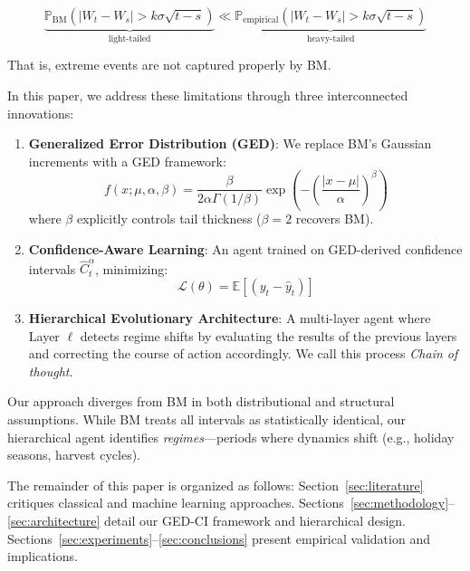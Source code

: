 \documentclass[12pt]{article}
\begin{document}
\begin{equation}
    \underbrace{\mathbb{P}_{\text{BM}}\left(|W_t - W_s| > k\sigma\sqrt{t-s}\right)}_{\text{light-tailed}} \ll \underbrace{\mathbb{P}_{\text{empirical}}(|W_t - W_s| > k\sigma\sqrt{t-s})}_{\text{heavy-tailed}}
\end{equation}

That is, extreme events are not captured properly by BM.


In this paper, we address these limitations through three interconnected innovations:
\begin{enumerate}
    \item \textbf{Generalized Error Distribution (GED)}: We replace BM's Gaussian increments with a GED framework:
    \begin{equation}
        f(x; \mu, \alpha, \beta) = \frac{\beta}{2\alpha\Gamma(1/\beta)} \exp\left(-\left(\frac{|x-\mu|}{\alpha}\right)^\beta\right)
    \end{equation}
    where $\beta$ explicitly controls tail thickness ($\beta=2$ recovers BM).
    
    \item \textbf{Confidence-Aware Learning}: An agent trained on GED-derived confidence intervals $\hat{C}_t^\alpha$, minimizing:
    \begin{equation}
        \mathscr{L}(\theta) = \mathbb{E}\left[ (y_t - \hat{y}_t) \right]
    \end{equation}
    
\item \textbf{Hierarchical Evolutionary Architecture}: A multi-layer agent where Layer $\ell$ detects regime shifts by evaluating the results of the previous layers and correcting the course of action accordingly. We call this process \emph{Chain of thought}.
\end{enumerate}

Our approach diverges from BM in both distributional and structural assumptions. While BM treats all intervals as statistically identical, our hierarchical agent identifies \emph{regimes}---periods where dynamics shift (e.g., holiday seasons, harvest cycles). 

The remainder of this paper is organized as follows: Section~\ref{sec:literature} critiques classical and machine learning approaches. Sections~\ref{sec:methodology}--\ref{sec:architecture} detail our GED-CI framework and hierarchical design. Sections~\ref{sec:experiments}--\ref{sec:conclusions} present empirical validation and implications.
\end{document}

